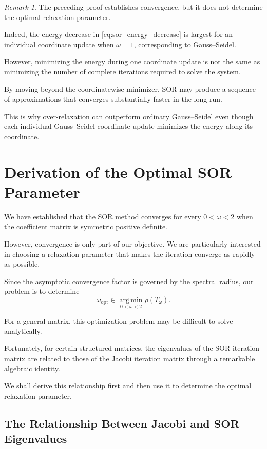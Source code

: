 \documentclass[11pt,a4paper]{article}
\theoremstyle{definition}
\theoremstyle{remark}
\newtheorem{remark}[theorem]{Remark}
\begin{document}
\begin{remark}
The preceding proof establishes convergence,
but it does not determine the optimal
relaxation parameter.

Indeed, the energy decrease in
\eqref{eq:sor_energy_decrease} is largest
for an individual coordinate update when
$\omega=1$, corresponding to Gauss--Seidel.

However, minimizing the energy during one
coordinate update is not the same as minimizing
the number of complete iterations required
to solve the system.

By moving beyond the coordinatewise minimizer,
SOR may produce a sequence of approximations
that converges substantially faster in the
long run.

This is why over-relaxation can outperform
ordinary Gauss--Seidel even though each
individual Gauss--Seidel coordinate update
minimizes the energy along its coordinate.
\end{remark}


\section{Derivation of the Optimal SOR Parameter}

We have established that the SOR method converges
for every $0<\omega<2$ when the coefficient matrix
is symmetric positive definite.

However, convergence is only part of our objective.
We are particularly interested in choosing a
relaxation parameter that makes the iteration
converge as rapidly as possible.

Since the asymptotic convergence factor is
governed by the spectral radius, our problem is
to determine
\begin{equation}
    \boxed{
    \omega_{\mathrm{opt}}
    \in
    \operatorname*{arg\,min}_{0<\omega<2}
    \rho(T_\omega).
    }
    \label{eq:optimal_sor_problem}
\end{equation}

For a general matrix, this optimization problem
may be difficult to solve analytically.

Fortunately, for certain structured matrices,
the eigenvalues of the SOR iteration matrix
are related to those of the Jacobi iteration
matrix through a remarkable algebraic identity.

We shall derive this relationship first and
then use it to determine the optimal
relaxation parameter.


\subsection{The Relationship Between Jacobi and SOR Eigenvalues}
\end{document}
